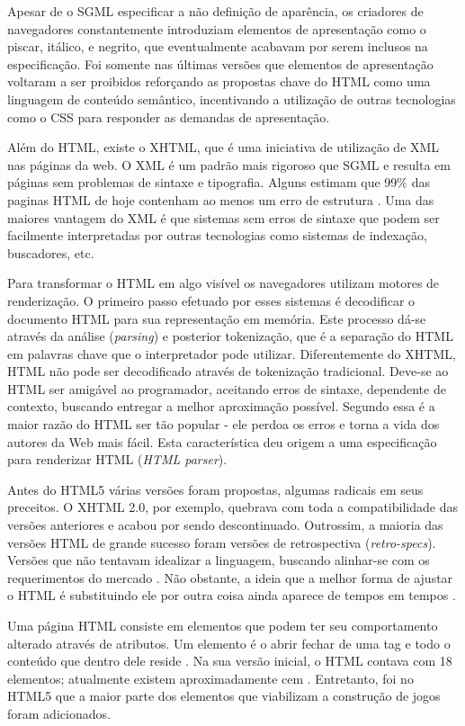 Apesar de o SGML especificar a não definição de aparência, os criadores de
navegadores constantemente introduziam elementos de apresentação como o
piscar, itálico, e negrito, que eventualmente acabavam por serem inclusos
na especificação. Foi somente nas últimas versões que elementos de
apresentação voltaram a ser proibidos reforçando as propostas chave
do HTML como uma linguagem de conteúdo semântico, incentivando a
utilização de outras tecnologias como o CSS para responder as demandas de
apresentação.

Além do HTML, existe o XHTML, que é uma iniciativa de utilização de
XML nas páginas da web. O XML é um padrão mais rigoroso que SGML e
resulta em páginas sem problemas de sintaxe e tipografia. 
Alguns estimam que 99\% das paginas HTML de hoje
contenham ao menos um erro de estrutura \autocite{diveIntohtml}.
Uma das maiores vantagem do XML é que sistemas sem erros de sintaxe
que podem ser facilmente interpretadas por outras tecnologias como
sistemas de indexação, buscadores, etc.

Para transformar o HTML em algo visível os navegadores utilizam motores
de renderização. O primeiro passo efetuado por esses sistemas é
decodificar o documento HTML para sua representação em memória. Este
processo dá-se através da análise (\textit{parsing}) e posterior
tokenização, que é a separação do HTML em palavras chave que o
interpretador pode utilizar. Diferentemente do XHTML, HTML não pode
ser decodificado através de tokenização tradicional. Deve-se ao HTML
ser amigável ao programador, aceitando erros de sintaxe, dependente
de contexto, buscando entregar a melhor aproximação possível. 
Segundo \citet{howBrowsersWork} essa é a maior razão do HTML ser tão popular - 
ele perdoa os erros e torna a vida dos autores da Web mais fácil. Esta
característica deu origem a uma especificação para renderizar HTML
(\textit{HTML parser}).

Antes do HTML5 várias versões foram propostas, algumas radicais
em seus preceitos. O XHTML 2.0, por exemplo, quebrava com toda
a compatibilidade das versões anteriores e acabou por sendo descontinuado.
Outrossim, a maioria das versões HTML de grande sucesso foram versões de
retrospectiva (\textit{retro-specs}). Versões que não tentavam
idealizar a linguagem, buscando alinhar-se com os requerimentos do
mercado \autocite{diveIntohtml}. Não obstante, a ideia que a melhor forma
de ajustar o HTML é substituindo ele por outra coisa ainda aparece de tempos
em tempos \autocite{diveIntohtml}.

Uma página HTML consiste em elementos que podem ter seu comportamento
alterado através de atributos. Um elemento é o abrir fechar de
uma tag e todo o conteúdo que dentro dele reside \autocite[p.
10--11]{htmlAndCssDucket}. Na sua versão inicial, o HTML
contava com 18 elementos; atualmente existem aproximadamente cem
\autocite{diveIntohtml}. Entretanto, foi no HTML5 que a maior parte dos
elementos que viabilizam a construção de jogos foram adicionados.

